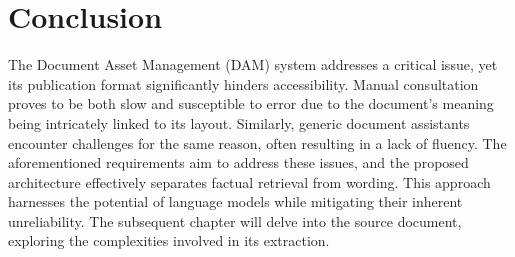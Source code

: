 \section*{Conclusion}

The Document Asset Management (DAM) system addresses a critical issue, yet its publication format significantly hinders accessibility. Manual consultation proves to be both slow and susceptible to error due to the document's meaning being intricately linked to its layout. Similarly, generic document assistants encounter challenges for the same reason, often resulting in a lack of fluency. The aforementioned requirements aim to address these issues, and the proposed architecture effectively separates factual retrieval from wording. This approach harnesses the potential of language models while mitigating their inherent unreliability. The subsequent chapter will delve into the source document, exploring the complexities involved in its extraction.
